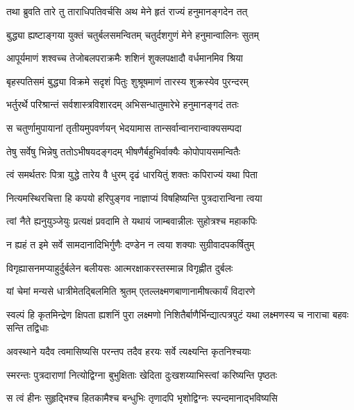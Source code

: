 
\twolineshloka
{तथा ब्रुवति तारे तु ताराधिपतिवर्चसि}
{अथ मेने हृतं राज्यं हनुमानङ्गदेन तत्} %

\twolineshloka
{बुद्ध्या ह्यष्टाङ्गया युक्तं चतुर्बलसमन्वितम्}
{चतुर्दशगुणं मेने हनुमान्वालिनः सुतम्} %

\twolineshloka
{आपूर्यमाणं शश्वच्च तेजोबलपराक्रमैः}
{शशिनं शुक्लपक्षादौ वर्धमानमिव श्रिया} %

\twolineshloka
{बृहस्पतिसमं बुद्ध्या विक्रमे सदृशं पितुः}
{शुश्रूषमाणं तारस्य शुक्रस्येव पुरन्दरम्} %

\twolineshloka
{भर्तुरर्थे परिश्रान्तं सर्वशास्त्रविशारदम्}
{अभिसन्धातुमारेभे हनुमानङ्गदं ततः} %

\twolineshloka
{स चतुर्णामुपायानां तृतीयमुपवर्णयन्}
{भेदयामास तान्सर्वान्वानरान्वाक्यसम्पदा} %

\twolineshloka
{तेषु सर्वेषु भिन्नेषु ततोऽभीषयदङ्गदम्}
{भीषणैर्बहुभिर्वाक्यैः कोपोपायसमन्वितैः} %

\twolineshloka
{त्वं समर्थतरः पित्रा युद्धे तारेय वै धुरम्}
{दृढं धारयितुं शक्तः कपिराज्यं यथा पिता} %

\twolineshloka
{नित्यमस्थिरचित्ता हि कपयो हरिपुङ्गव}
{नाज्ञाप्यं विषहिष्यन्ति पुत्रदारान्विना त्वया} %

\twolineshloka
{त्वां नैते ह्यनुयुञ्जेयुः प्रत्यक्षं प्रवदामि ते}
{यथायं जाम्बवान्नीलः सुहोत्रश्च महाकपिः} %

\twolineshloka
{न ह्यहं त इमे सर्वे सामदानादिभिर्गुणैः}
{दण्डेन न त्वया शक्याः सुग्रीवादपकर्षितुम्} %

\twolineshloka
{विगृह्यासनमप्याहुर्दुर्बलेन बलीयसः}
{आत्मरक्षाकरस्तस्मान्न विगृह्णीत दुर्बलः} %

\twolineshloka
{यां चेमां मन्यसे धात्रीमेतद्बिलमिति श्रुतम्}
{एतल्लक्ष्मणबाणानामीषत्कार्यं विदारणे} %

\threelineshloka
{स्वल्पं हि कृतमिन्द्रेण क्षिपता ह्यशनिं पुरा}
{लक्ष्मणो निशितैर्बाणैर्भिन्द्यात्पत्रपुटं यथा}
{लक्ष्मणस्य च नाराचा बहवः सन्ति तद्विधाः} %

\twolineshloka
{अवस्थाने यदैव त्वमासिष्यसि परन्तप}
{तदैव हरयः सर्वे त्यक्ष्यन्ति कृतनिश्चयाः} %

\twolineshloka
{स्मरन्तः पुत्रदाराणां नित्योद्विग्ना बुभुक्षिताः}
{खेदिता दुःखशय्याभिस्त्वां करिष्यन्ति पृष्ठतः} %

\twolineshloka
{स त्वं हीनः सुहृद्भिश्च हितकामैश्च बन्धुभिः}
{तृणादपि भृशोद्विग्नः स्पन्दमानाद्भविष्यसि} %

